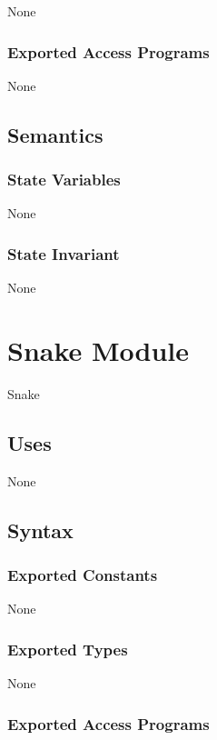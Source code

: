 \documentclass[12pt, titlepage]{article}
\begin{document}
None

\subsubsection* {Exported Access Programs}

None

\subsection* {Semantics}

\subsubsection* {State Variables}

None

\subsubsection* {State Invariant}

None

\section{Snake Module}

Snake

\subsection* {Uses}

None

\subsection* {Syntax}

\subsubsection* {Exported Constants}

None

\subsubsection* {Exported Types}

None

\subsubsection* {Exported Access Programs}
\end{document}
